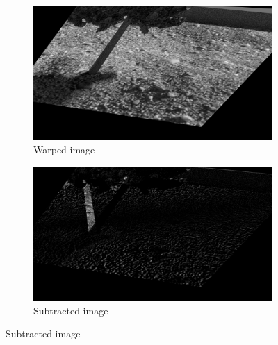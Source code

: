 \documentclass[fleqn,10pt]{SelfArx} %
\begin{document}
\begin{figure}
        \begin{subfigure}[b]{0.35\textwidth}
                \includegraphics[width=\linewidth]{Figures/GroundDetection_with_ImagePair/im1(2)_step1_warped.png}
                \caption{Warped image}
                \label{fig:GPWarp}
        \end{subfigure}%
        \begin{subfigure}[b]{0.35\textwidth}
                \includegraphics[width=\linewidth]{Figures/GroundDetection_with_ImagePair/im1(2)_step2_subtracted.png}
                \caption{Subtracted image}
                \label{fig:GPSub}
        \end{subfigure}%
        

\end{figure}
\end{document}

